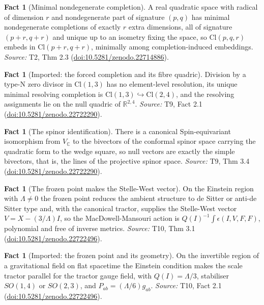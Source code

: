 \documentclass[11pt]{article}
\theoremstyle{definition}
\newtheorem{fact}[theorem]{Fact}
\theoremstyle{plain}
\providecommand{\C}{}\renewcommand{\C}{\mathbb{C}}
\providecommand{\Cl}{}\renewcommand{\Cl}{\mathrm{Cl}}
\providecommand{\R}{}\renewcommand{\R}{\mathbb{R}}
\providecommand{\Spin}{}\renewcommand{\Spin}{\mathrm{Spin}}
\begin{document}
\begin{fact}[Minimal nondegenerate completion]\label{c:conformal.minimal-nondegenerate-completion}
A real quadratic space with radical of dimension $r$ and nondegenerate part of signature $(p,q)$ has minimal nondegenerate completions of exactly $r$ extra dimensions, all of signature $(p+r,q+r)$ and unique up to an isometry fixing the space, so $\Cl(p,q,r)$ embeds in $\Cl(p+r,q+r)$, minimally among completion-induced embeddings.
\emph{Source:} T2, Thm 2.3 (\href{https://doi.org/10.5281/zenodo.22714886}{doi:10.5281/zenodo.22714886}).
\end{fact}

\begin{fact}[Imported: the forced completion and its fibre quadric]\label{c:correspondence.imported-forced-completion-fibre-quadric}
Division by a type-N zero divisor in $\Cl(1,3)$ has no element-level resolution, its unique minimal resolving completion is $\Cl(1,3) \hookrightarrow \Cl(2,4)$, and the resolving assignments lie on the null quadric of $\R^{2,4}$.
\emph{Source:} T9, Fact 2.1 (\href{https://doi.org/10.5281/zenodo.22722290}{doi:10.5281/zenodo.22722290}).
\end{fact}

\begin{fact}[The spinor identification]\label{c:correspondence.spinor-identification}
There is a canonical $\Spin$-equivariant isomorphism from $V_\C$ to the bivectors of the conformal spinor space carrying the quadratic form to the wedge square, so null vectors are exactly the simple bivectors, that is, the lines of the projective spinor space.
\emph{Source:} T9, Thm 3.4 (\href{https://doi.org/10.5281/zenodo.22722290}{doi:10.5281/zenodo.22722290}).
\end{fact}

\begin{fact}[The frozen point makes the Stelle-West vector]\label{c:dark-energy.frozen-point-makes-stelle-west-vector}
On the Einstein region with $\Lambda\neq 0$ the frozen point reduces the ambient structure to de Sitter or anti-de Sitter type and, with the canonical tractor, supplies the Stelle-West vector $V = X - (3/\Lambda)I$, so the MacDowell-Mansouri action is $Q(I)^{-1}\int\epsilon(I,V,F,F)$, polynomial and free of inverse metrics.
\emph{Source:} T10, Thm 3.1 (\href{https://doi.org/10.5281/zenodo.22722496}{doi:10.5281/zenodo.22722496}).
\end{fact}

\begin{fact}[Imported: the frozen point and its geometry]\label{c:dark-energy.imported-frozen-point-geometry}
On the invertible region of a gravitational field on flat spacetime the Einstein condition makes the scale tractor parallel for the tractor gauge field, with $Q(I) = \Lambda/3$, stabiliser $SO(1,4)$ or $SO(2,3)$, and $P_{ab} = (\Lambda/6)g_{ab}$.
\emph{Source:} T10, Fact 2.1 (\href{https://doi.org/10.5281/zenodo.22722496}{doi:10.5281/zenodo.22722496}).
\end{fact}
\end{document}
